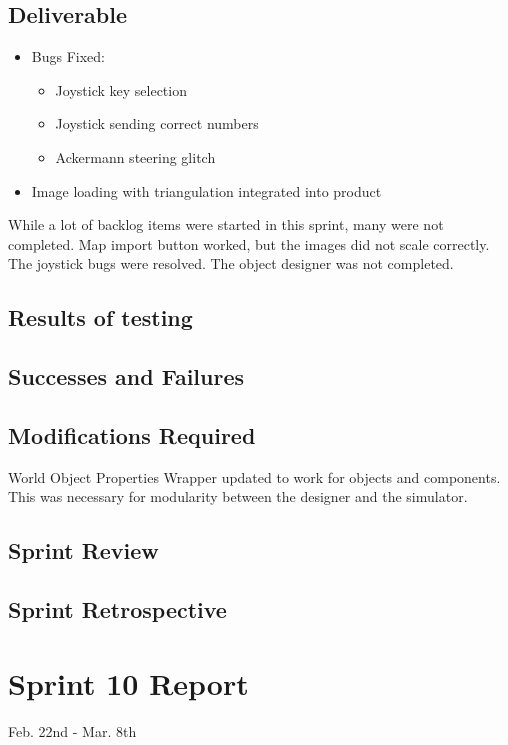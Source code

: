 \subsection{Deliverable}

\begin{itemize}
	\item Bugs Fixed:	
\begin{itemize}
	\item Joystick key selection
	\item Joystick sending correct numbers
	\item Ackermann steering glitch
\end{itemize}
	\item Image loading with triangulation integrated into product
\end{itemize}


While a lot of backlog items were started in this sprint, many were not completed. Map import button worked, but the images did not scale correctly. The joystick bugs were resolved. The object designer was not completed.

\subsection{Results of testing}


\subsection{Successes and Failures}


\subsection{Modifications Required}

World Object Properties Wrapper updated to work for objects and components. This was necessary for modularity between the designer and the simulator.

\subsection{Sprint Review}


\subsection{Sprint Retrospective}

\section{Sprint 10 Report}
Feb. 22nd - Mar. 8th
